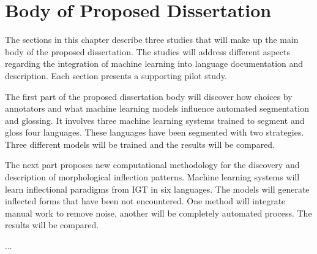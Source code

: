 \chapter{Body of Proposed Dissertation}
\label{chap:body}

The sections in this chapter describe three studies that will make up the main body of the proposed dissertation. The studies will address different aspects regarding the integration of machine learning into language documentation and description. %
Each section presents a supporting pilot study.

The first part of the proposed dissertation body will discover how choices by annotators and what machine learning models influence automated segmentation and glossing. It involves three machine learning systems trained to segment and gloss four languages. These languages have been segmented with two strategies. Three different models will be trained and the results will be compared.  


The next part proposes new computational methodology for the discovery and description of morphological inflection patterns. Machine learning systems will learn inflectional paradigms from IGT in six languages. The models will generate inflected forms that have been not encountered. One method will integrate manual work to remove noise, another will be completely automated process. The results will be compared.

...



%

